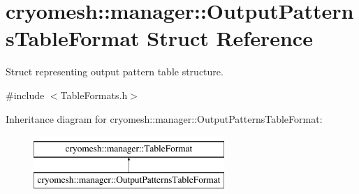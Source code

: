 \hypertarget{structcryomesh_1_1manager_1_1OutputPatternsTableFormat}{\section{cryomesh\-:\-:manager\-:\-:\-Output\-Patterns\-Table\-Format \-Struct \-Reference}
\label{structcryomesh_1_1manager_1_1OutputPatternsTableFormat}
}


\-Struct representing output pattern table structure.  




{\ttfamily \#include $<$\-Table\-Formats.\-h$>$}

\-Inheritance diagram for cryomesh\-:\-:manager\-:\-:\-Output\-Patterns\-Table\-Format\-:\begin{figure}[H]
\begin{center}
\leavevmode
\includegraphics[height=2.000000cm]{structcryomesh_1_1manager_1_1OutputPatternsTableFormat}
\end{center}
\end{figure}
